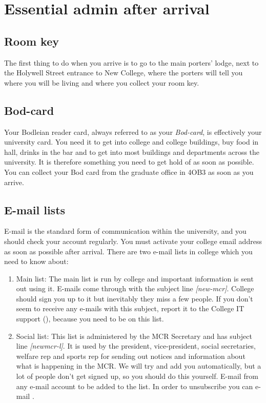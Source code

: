 
\chapter{Essential admin after arrival}

\section{Room key}
The first thing to do when you arrive is to go to the main porters' lodge, next
to the Holywell Street entrance to New College, where the porters will tell you where you will be living and where you collect your room key. 
\section{Bod-card}
Your Bodleian reader card, always referred to as your \emph{Bod-card}, is effectively
your university card. You need it to get into college and college buildings, buy food in hall, drinks in the bar and to get into most buildings and departments across the university. It is therefore something you need to get hold of as soon as possible. You can collect your Bod card from the graduate office in 4OB3 as soon as you arrive.
\section{E-mail lists}
E-mail is the standard form of communication within the university, and you should check your account regularly. You must activate your college email address as soon as possible after arrival. There are two e-mail lists in college which you need to know about:
\begin{enumerate}
  \item Main list: The main list is run by college and important
information is sent out using it. E-mails come through with the subject line
\emph{[new-mcr]}. College should sign you up to it but inevitably they miss a
few people. If you don't seem to receive any e-mails with this subject, report it to the College IT support (\href{mailto:it-support@new.ox.ac.uk}{}), because you need to be on this list.
  \item Social list: This list is administered by the MCR Secretary and has subject line
\emph{[newmcr-l]}. It is used by the president, vice-president, social secretaries, welfare rep and sports rep for
sending out notices and information about what is happening in the MCR. We will
try and add you automatically, but a lot of people don't get signed up, so you
should do this yourself. E-mail
\href{mailto:newmcr-l-subscribe@maillist.ox.ac.uk }{}
from any e-mail account to be added to the list. In order to unsubscribe you can
e-mail
\href{mailto:newmcr-l-unsubscribe@maillist.ox.ac.uk}{}.
\end{enumerate}

